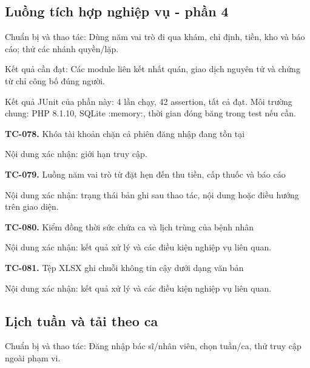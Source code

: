 \par\vspace{8pt}

\subsection{Luồng tích hợp nghiệp vụ - phần 4}
Chuẩn bị và thao tác:\allowbreak{} Dùng năm vai trò đi qua khám, chỉ định, tiền, kho và báo cáo; thử các nhánh quyền/\allowbreak{}lặp.\allowbreak{}

Kết quả cần đạt:\allowbreak{} Các module liên kết nhất quán, giao dịch nguyên tử và chứng từ chỉ công bố đúng người.\allowbreak{}

Kết quả JUnit của phần này:\allowbreak{} 4 lần chạy, 42 assertion, tất cả đạt.\allowbreak{} Môi trường chung:\allowbreak{} PHP 8.\allowbreak{}1.\allowbreak{}10, SQLite :\allowbreak{}memory:\allowbreak{}, thời gian đóng băng trong test nếu cần.\allowbreak{}

\noindent\textbf{TC-078.} Khóa tài khoản chặn cả phiên đăng nhập đang tồn tại\par
Nội dung xác nhận:\allowbreak{} giới hạn truy cập.\allowbreak{}

\noindent\textbf{TC-079.} Luồng năm vai trò từ đặt hẹn đến thu tiền, cấp thuốc và báo cáo\par
Nội dung xác nhận:\allowbreak{} trạng thái bản ghi sau thao tác, nội dung hoặc điều hướng trên giao diện.\allowbreak{}

\noindent\textbf{TC-080.} Kiểm đồng thời sức chứa ca và lịch trùng của bệnh nhân\par
Nội dung xác nhận:\allowbreak{} kết quả xử lý và các điều kiện nghiệp vụ liên quan.\allowbreak{}

\noindent\textbf{TC-081.} Tệp XLSX ghi chuỗi không tin cậy dưới dạng văn bản\par
Nội dung xác nhận:\allowbreak{} kết quả xử lý và các điều kiện nghiệp vụ liên quan.\allowbreak{}


\par\vspace{8pt}

\subsection{Lịch tuần và tải theo ca}
Chuẩn bị và thao tác:\allowbreak{} Đăng nhập bác sĩ/\allowbreak{}nhân viên, chọn tuần/\allowbreak{}ca, thử truy cập ngoài phạm vi.\allowbreak{}

